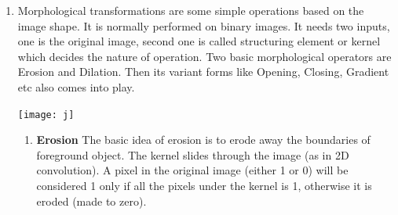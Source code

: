 
\begin{enumerate}
  \item Morphological transformations are some simple operations based on the image shape. It is normally performed on binary images. It needs two inputs, one is the original image, second one is called structuring element or kernel which decides the nature of operation. Two basic morphological operators are Erosion and Dilation. Then its variant forms like Opening, Closing, Gradient etc also comes into play.
    \begin{center}
        \texttt{[image: j]}
    \end{center}
    \begin{enumerate}
    \item \textbf{Erosion}
    The basic idea of erosion is to erode away the boundaries of foreground object. The kernel slides through the image (as in 2D convolution). A pixel in the original image (either 1 or 0) will be considered 1 only if all the pixels under the kernel is 1, otherwise it is eroded (made to zero).


\end{enumerate}
\end{enumerate}
